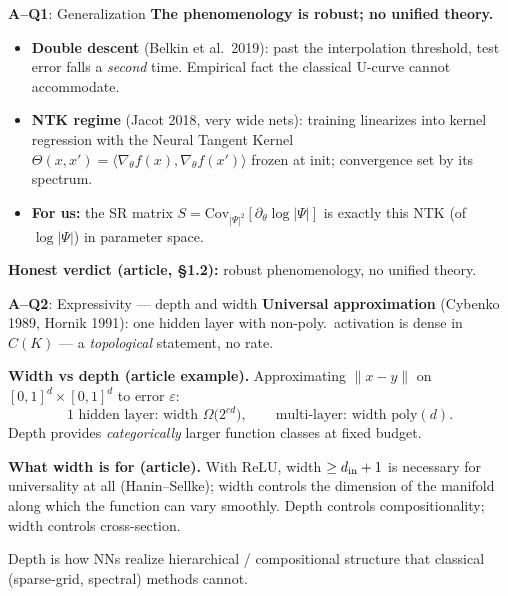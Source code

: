 \documentclass[10pt,aspectratio=169]{beamer}
\newcommand{\paperA}[1]{\textcolor{papA}{\textbf{#1}}}
\newcommand{\ours}[1]{\textcolor{ourwork}{\textbf{#1}}}
\begin{document}
\begin{frame}{\paperA{A--Q1}: Generalization}
\small
\textbf{The phenomenology is robust; no unified theory.}

\vspace{2pt}
\begin{itemize}\setlength\itemsep{2pt}\small
\item \paperA{Double descent} (Belkin et al.\ 2019): past the interpolation threshold, test error
falls a \emph{second} time. Empirical fact the classical U-curve cannot accommodate.
\item \paperA{NTK regime} (Jacot 2018, very wide nets): training linearizes into kernel regression
with the Neural Tangent Kernel
$\Theta(x,x')=\langle\nabla_\theta f(x),\nabla_\theta f(x')\rangle$ frozen at init; convergence set
by its spectrum.
\item \ours{For us:} the SR matrix $S=\mathrm{Cov}_{|\Psi|^2}[\partial_\theta\log|\Psi|]$ is exactly
this NTK (of $\log|\Psi|$) in parameter space.
\end{itemize}

\vspace{4pt}
\begin{tcolorbox}[colback=papA!5,colframe=papA!60,boxsep=2pt]
\small \textbf{Honest verdict (article, \S1.2):} robust phenomenology, no unified theory.
\end{tcolorbox}
\end{frame}

\begin{frame}{\paperA{A--Q2}: Expressivity --- depth and width}
\small
\textbf{Universal approximation} (Cybenko 1989, Hornik 1991): one hidden layer with non-poly.\
activation is dense in $C(K)$ --- a \emph{topological} statement, no rate.

\vspace{4pt}
\textbf{Width vs depth (article example).} Approximating $\|x-y\|$ on $[0,1]^d\times[0,1]^d$ to error
$\varepsilon$:
\[
  \text{1 hidden layer: width } \Omega\!\bigl(2^{cd}\bigr),\qquad
  \text{multi-layer: width } \mathrm{poly}(d).
\]
Depth provides \emph{categorically} larger function classes at fixed budget.

\vspace{4pt}
\textbf{What width is for (article).} With $\mathrm{ReLU}$, width $\ge d_{\rm in}+1$ is necessary for
universality at all (Hanin--Sellke); width controls the dimension of the manifold along which the
function can vary smoothly. Depth controls compositionality; width controls cross-section.

\vspace{4pt}
\begin{tcolorbox}[colback=papA!5,colframe=papA!60,boxsep=2pt]
\small Depth is how NNs realize hierarchical / compositional structure that classical
(sparse-grid, spectral) methods cannot.
\end{tcolorbox}
\end{frame}
\end{document}
